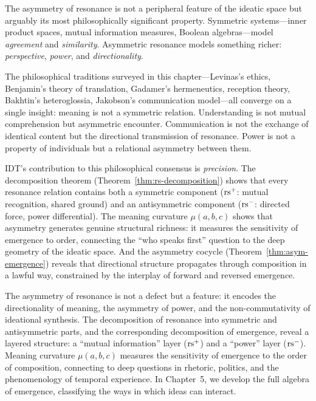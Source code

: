 \begin{interpretation}\label{interp:ch4:asymmetry_foundation}
The asymmetry of resonance is not a peripheral feature of the ideatic
space but arguably its most philosophically significant property.
Symmetric systems---inner product spaces, mutual information measures,
Boolean algebras---model \emph{agreement} and \emph{similarity}.
Asymmetric resonance models something richer: \emph{perspective},
\emph{power}, and \emph{directionality}.

The philosophical traditions surveyed in this chapter---Levinas's ethics,
Benjamin's theory of translation, Gadamer's hermeneutics, reception
theory, Bakhtin's heteroglossia, Jakobson's communication model---all
converge on a single insight: meaning is not a symmetric relation.
Understanding is not mutual comprehension but asymmetric encounter.
Communication is not the exchange of identical content but the
directional transmission of resonance. Power is not a property of
individuals but a relational asymmetry between them.

IDT's contribution to this philosophical consensus is \emph{precision}.
The decomposition theorem (Theorem~\ref{thm:rs-decomposition}) shows
that every resonance relation contains both a symmetric component
($\mathrm{rs}^+$: mutual recognition, shared ground) and an antisymmetric
component ($\mathrm{rs}^-$: directed force, power differential). The meaning
curvature $\mu(a, b, c)$ shows that asymmetry generates genuine
structural richness: it measures the sensitivity of emergence to order,
connecting the ``who speaks first'' question to the deep geometry of
the ideatic space. And the asymmetry cocycle
(Theorem~\ref{thm:asym-emergence}) reveals that directional structure
propagates through composition in a lawful way, constrained by the
interplay of forward and reversed emergence.
\end{interpretation}

The asymmetry of resonance is not a defect but a feature: it encodes the
directionality of meaning, the asymmetry of power, and the non-commutativity
of ideational synthesis. The decomposition of resonance into symmetric and
antisymmetric parts, and the corresponding decomposition of emergence,
reveal a layered structure: a ``mutual information'' layer ($\mathrm{rs}^+$) and a
``power'' layer ($\mathrm{rs}^-$). Meaning curvature $\mu(a,b,c)$ measures the
sensitivity of emergence to the order of composition, connecting to deep
questions in rhetoric, politics, and the phenomenology of temporal
experience. In Chapter~5, we develop the full algebra of emergence,
classifying the ways in which ideas can interact.


